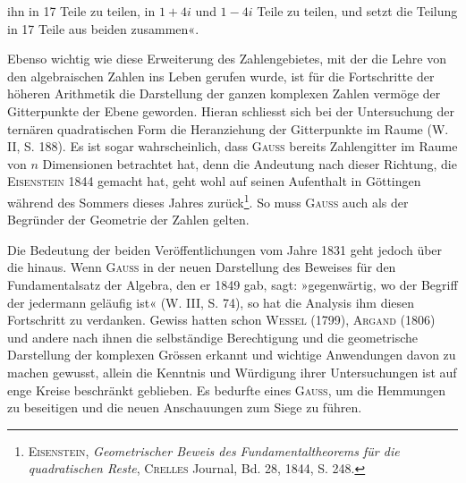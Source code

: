 ihn in 17 Teile zu teilen, in \(1+4i\) und \(1-4i\) Teile zu teilen, und setzt die
Teilung in 17 Teile aus beiden zusammen«.
\par
Ebenso wichtig wie diese Erweiterung des Zahlengebietes, mit der die
Lehre von den algebraischen Zahlen ins Leben gerufen wurde, ist für die
Fortschritte der höheren Arithmetik die Darstellung der ganzen komplexen
Zahlen vermöge der Gitterpunkte der Ebene geworden. Hieran schliesst sich
bei der Untersuchung der ternären quadratischen Form die Heranziehung der
Gitterpunkte im Raume (W. II, S. 188). Es ist sogar wahrscheinlich, dass
\textsc{Gauss} bereits Zahlengitter im Raume von \(n\) Dimensionen betrachtet hat, denn
die Andeutung nach dieser Richtung, die \textsc{Eisenstein} 1844 gemacht hat, geht
wohl auf seinen Aufenthalt in Göttingen während des Sommers dieses Jahres
zurück\footnote{\textsc{Eisenstein}, \textit{Geometrischer Beweis des Fundamentaltheorems für die quadratischen Reste}, \textsc{Crelles} Journal, Bd. 28, 1844, S. 248.}. So muss \textsc{Gauss} auch als der Begründer der Geometrie der Zahlen
gelten.
\par
Die Bedeutung der beiden Veröffentlichungen vom Jahre 1831 geht jedoch
über die  hinaus. Wenn \textsc{Gauss} in der neuen Darstellung des
Beweises für den Fundamentalsatz der Algebra, den er 1849 gab, sagt: »gegenwärtig,
wo der Begriff der  jedermann geläufig ist« (W.
III, S. 74), so hat die Analysis ihm diesen Fortschritt zu verdanken. Gewiss
hatten schon \textsc{Wessel} (1799), \textsc{Argand} (1806) und andere nach ihnen die selbständige
Berechtigung und die geometrische Darstellung der komplexen Grössen
erkannt und wichtige Anwendungen davon zu machen gewusst, allein die
Kenntnis und Würdigung ihrer Untersuchungen ist auf enge Kreise beschränkt
geblieben. Es bedurfte eines \textsc{Gauss}, um die Hemmungen zu beseitigen und
die neuen Anschauungen zum Siege zu führen.
\clearpage\endgroup


